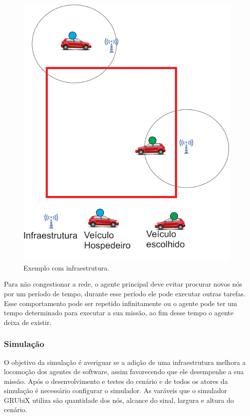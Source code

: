 \begin{figure}[htbp]
	\centering
	\includegraphics[scale=0.5]{metodologia/figuras/exemploComInfraestrutura.pdf}
	\caption{Exemplo com infraestrutura.}
	\label{fig:exemploComInfraestrutura}
\end{figure}

Para não congestionar a rede, o agente principal deve evitar procurar novos nós por um período de tempo, durante esse período ele pode executar outras tarefas. Esse comportamento pode ser repetido infinitamente ou o agente pode ter um tempo determinado para executar a sua missão, ao fim desse tempo o agente deixa de existir.
\subsubsection{Simulação}

O objetivo da simulação é averiguar se a adição de uma infraestrutura melhora a locomoção dos agentes de software, assim favorecendo que ele desempenhe a sua missão. Após o desenvolvimento e testes do cenário e de todos os atores da simulação é necessário configurar o simulador. As varáveis que o simulador GRUbiX utiliza são quantidade dos nós, alcance do sinal, largura e altura do cenário. 

